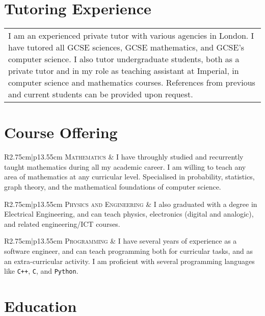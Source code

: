 \documentclass[a4paper,10pt]{article} %
\newcommand\rightColumnWidth{13.55cm}
\newcommand\leftColumnWidth{2.75cm}
\newcommand\pageWidth{16cm}
\begin{document}
\section{Tutoring Experience}
\begin{tabular}{p{\pageWidth}}
    I am an experienced private tutor with various agencies in London.
    I have tutored all GCSE sciences, GCSE mathematics, and GCSE's computer science.
    I also tutor undergraduate students, both as a private tutor and in my role as teaching assistant at Imperial, in computer science and mathematics courses.
    References from previous and current students can be provided upon request.
\end{tabular}

\section{Course Offering}
%
\begin{tabular}{R{\leftColumnWidth}|p{\rightColumnWidth}}
    \textsc{Mathematics} &
    I have throughly studied and recurrently taught mathematics during all my
    academic career.
    I am willing to teach any area of mathematics at any curricular level.
    Specialised in probability, statistics, graph theory, and the mathematical
    foundations of computer science.
    \\
\end{tabular}

\begin{tabular}{R{\leftColumnWidth}|p{\rightColumnWidth}}
    \textsc{Physics and Engineering} &
    I also graduated with a degree in Electrical Engineering, and can teach
    physics, electronics (digital and analogic), and related engineering/ICT
    courses.
\end{tabular}

\begin{tabular}{R{\leftColumnWidth}|p{\rightColumnWidth}}
    \textsc{Programming} &
    I have several years of experience as a software engineer, and can teach
    programming both for curricular tasks, and as an extra-curricular activity.
    I am proficient with several programming languages like \texttt{C++},
    \texttt{C}, and \texttt{Python}.
    \\
\end{tabular}

\section{Education}
\end{document}
